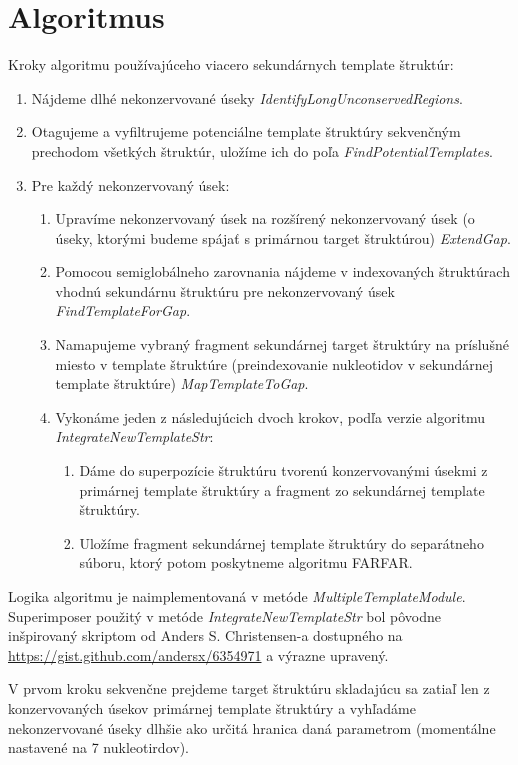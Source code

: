\section{Algoritmus}
\indent Kroky algoritmu používajúceho viacero sekundárnych template štruktúr:
\begin{enumerate}
\item Nájdeme dlhé nekonzervované úseky \textit{IdentifyLongUnconservedRegions}.
\item Otagujeme a vyfiltrujeme potenciálne template štruktúry sekvenčným prechodom všetkých štruktúr, uložíme  ich do poľa \textit{FindPotentialTemplates}.
\item Pre každý nekonzervovaný úsek:
\begin{enumerate}
\item Upravíme nekonzervovaný úsek na rozšírený nekonzervovaný úsek (o úseky, ktorými budeme spájať s primárnou target štruktúrou) \textit{ExtendGap}.
\item Pomocou semiglobálneho zarovnania nájdeme v indexovaných štruktúrach vhodnú sekundárnu štruktúru pre nekonzervovaný úsek \textit{FindTemplateForGap}.
\item Namapujeme vybraný fragment sekundárnej target štruktúry na príslušné miesto v template štruktúre (preindexovanie nukleotidov v sekundárnej template štruktúre) \textit{MapTemplateToGap}.
\item Vykonáme jeden z následujúcich dvoch krokov, podľa verzie algoritmu \textit{IntegrateNewTemplateStr}:
\begin{enumerate}
\item Dáme do superpozície štruktúru tvorenú konzervovanými úsekmi z primárnej template štruktúry a fragment zo sekundárnej template štruktúry.
\item Uložíme fragment sekundárnej template štruktúry do separátneho súboru, ktorý potom poskytneme algoritmu FARFAR.
\end{enumerate}
\end{enumerate}
\end{enumerate}


\indent Logika algoritmu je naimplementovaná v metóde \textit{MultipleTemplateModule}. Superimposer použitý v metóde \textit{IntegrateNewTemplateStr} bol pôvodne inšpirovaný skriptom od Anders S. Christensen-a dostupného na \url{https://gist.github.com/andersx/6354971} a výrazne upravený.  


\indent V prvom kroku sekvenčne prejdeme target štruktúru skladajúcu sa zatiaľ len z konzervovaných úsekov primárnej template štruktúry a vyhľadáme nekonzervované úseky dlhšie ako určitá hranica daná parametrom (momentálne nastavené na 7 nukleotirdov).


